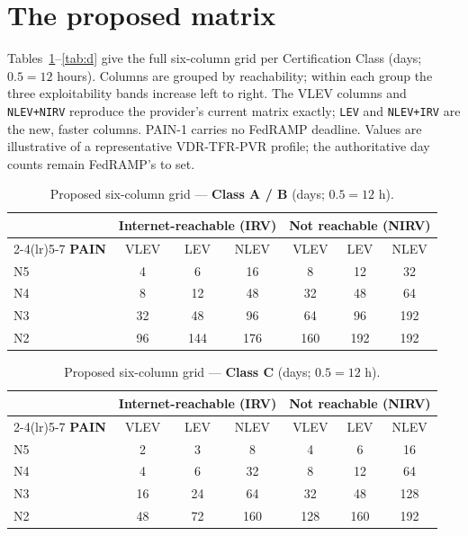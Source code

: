 \documentclass[11pt]{article}
\newcommand{\code}[1]{\texttt{#1}}
\begin{document}
\section{The proposed matrix}
Tables~\ref{tab:ab}--\ref{tab:d} give the full six-column grid per Certification Class
(days; $0.5 = 12$ hours). Columns are grouped by reachability; within each group the
three exploitability bands increase left to right. The VLEV columns and
\code{NLEV+NIRV} reproduce the provider's current matrix exactly; \code{LEV} and
\code{NLEV+IRV} are the new, faster columns. PAIN-1 carries no FedRAMP deadline.
Values are illustrative of a representative VDR-TFR-PVR profile; the authoritative day
counts remain FedRAMP's to set.

\begin{table}[H]
\centering
\footnotesize
\renewcommand{\arraystretch}{1.2}
\begin{tabular}{l ccc ccc}
\toprule
& \multicolumn{3}{c}{\textbf{Internet-reachable (IRV)}} & \multicolumn{3}{c}{\textbf{Not reachable (NIRV)}} \\
\cmidrule(lr){2-4}\cmidrule(lr){5-7}
\textbf{PAIN} & VLEV & LEV & NLEV & VLEV & LEV & NLEV \\
\midrule
N5 & 4  & 6   & 16  & 8   & 12  & 32 \\
N4 & 8  & 12  & 48  & 32  & 48  & 64 \\
N3 & 32 & 48  & 96  & 64  & 96  & 192 \\
N2 & 96 & 144 & 176 & 160 & 192 & 192 \\
\bottomrule
\end{tabular}
\caption{Proposed six-column grid --- \textbf{Class A / B} (days; $0.5 = 12$ h).}
\label{tab:ab}
\end{table}

\begin{table}[H]
\centering
\footnotesize
\renewcommand{\arraystretch}{1.2}
\begin{tabular}{l ccc ccc}
\toprule
& \multicolumn{3}{c}{\textbf{Internet-reachable (IRV)}} & \multicolumn{3}{c}{\textbf{Not reachable (NIRV)}} \\
\cmidrule(lr){2-4}\cmidrule(lr){5-7}
\textbf{PAIN} & VLEV & LEV & NLEV & VLEV & LEV & NLEV \\
\midrule
N5 & 2  & 3  & 8   & 4   & 6   & 16 \\
N4 & 4  & 6  & 32  & 8   & 12  & 64 \\
N3 & 16 & 24 & 64  & 32  & 48  & 128 \\
N2 & 48 & 72 & 160 & 128 & 160 & 192 \\
\bottomrule
\end{tabular}
\caption{Proposed six-column grid --- \textbf{Class C} (days; $0.5 = 12$ h).}
\label{tab:c}
\end{table}
\end{document}
